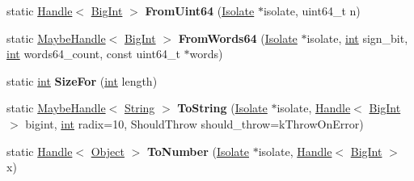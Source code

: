\begin{DoxyCompactItemize}
\mbox{\label{classv8_1_1internal_1_1BigInt_a7df25eb1750797b26ce9588754f919c3}} 
static \mbox{\hyperlink{classv8_1_1internal_1_1Handle}{Handle}}$<$ \mbox{\hyperlink{classv8_1_1internal_1_1BigInt}{Big\+Int}} $>$ {\bfseries From\+Uint64} (\mbox{\hyperlink{classv8_1_1internal_1_1Isolate}{Isolate}} $\ast$isolate, uint64\+\_\+t n)
\item 
\mbox{\label{classv8_1_1internal_1_1BigInt_aeabcd1e06ea0d8c1e330df4858ac86ef}} 
static \mbox{\hyperlink{classv8_1_1internal_1_1MaybeHandle}{Maybe\+Handle}}$<$ \mbox{\hyperlink{classv8_1_1internal_1_1BigInt}{Big\+Int}} $>$ {\bfseries From\+Words64} (\mbox{\hyperlink{classv8_1_1internal_1_1Isolate}{Isolate}} $\ast$isolate, \mbox{\hyperlink{classint}{int}} sign\+\_\+bit, \mbox{\hyperlink{classint}{int}} words64\+\_\+count, const uint64\+\_\+t $\ast$words)
\item 
\mbox{\label{classv8_1_1internal_1_1BigInt_a026cc7ab0f7fdf88734bb60bcb770c8a}} 
static \mbox{\hyperlink{classint}{int}} {\bfseries Size\+For} (\mbox{\hyperlink{classint}{int}} length)
\item 
\mbox{\label{classv8_1_1internal_1_1BigInt_abddf48eb621c0b26b81545911ba243cb}} 
static \mbox{\hyperlink{classv8_1_1internal_1_1MaybeHandle}{Maybe\+Handle}}$<$ \mbox{\hyperlink{classv8_1_1internal_1_1String}{String}} $>$ {\bfseries To\+String} (\mbox{\hyperlink{classv8_1_1internal_1_1Isolate}{Isolate}} $\ast$isolate, \mbox{\hyperlink{classv8_1_1internal_1_1Handle}{Handle}}$<$ \mbox{\hyperlink{classv8_1_1internal_1_1BigInt}{Big\+Int}} $>$ bigint, \mbox{\hyperlink{classint}{int}} radix=10, Should\+Throw should\+\_\+throw=k\+Throw\+On\+Error)
\item 
\mbox{\label{classv8_1_1internal_1_1BigInt_ae05ddc4fbfa9fc820c13fd192663f39d}} 
static \mbox{\hyperlink{classv8_1_1internal_1_1Handle}{Handle}}$<$ \mbox{\hyperlink{classv8_1_1internal_1_1Object}{Object}} $>$ {\bfseries To\+Number} (\mbox{\hyperlink{classv8_1_1internal_1_1Isolate}{Isolate}} $\ast$isolate, \mbox{\hyperlink{classv8_1_1internal_1_1Handle}{Handle}}$<$ \mbox{\hyperlink{classv8_1_1internal_1_1BigInt}{Big\+Int}} $>$ x)
\item 
\mbox{\label{classv8_1_1internal_1_1BigInt_a2faa6ede8f2a5649cd7eea80e9e732ca}} 

\end{DoxyCompactItemize}
